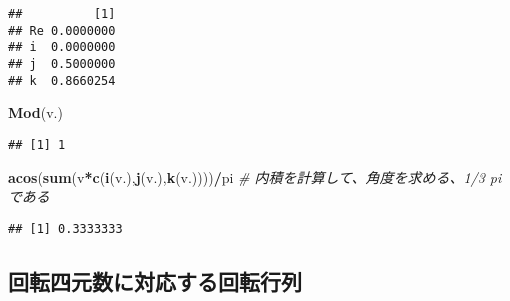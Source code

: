 \documentclass[]{article}
\newenvironment{Shaded}{\begin{snugshade}}{\end{snugshade}}
\newcommand{\KeywordTok}[1]{\textcolor[rgb]{0.13,0.29,0.53}{\textbf{#1}}}
\newcommand{\CommentTok}[1]{\textcolor[rgb]{0.56,0.35,0.01}{\textit{#1}}}
\newcommand{\OperatorTok}[1]{\textcolor[rgb]{0.81,0.36,0.00}{\textbf{#1}}}
\newcommand{\NormalTok}[1]{#1}
\begin{document}
\begin{verbatim}
##          [1]
## Re 0.0000000
## i  0.0000000
## j  0.5000000
## k  0.8660254
\end{verbatim}

\begin{Shaded}
\begin{Highlighting}[]
\KeywordTok{Mod}\NormalTok{(v.)}
\end{Highlighting}
\end{Shaded}

\begin{verbatim}
## [1] 1
\end{verbatim}

\begin{Shaded}
\begin{Highlighting}[]
\KeywordTok{acos}\NormalTok{(}\KeywordTok{sum}\NormalTok{(v}\OperatorTok{*}\KeywordTok{c}\NormalTok{(}\KeywordTok{i}\NormalTok{(v.),}\KeywordTok{j}\NormalTok{(v.),}\KeywordTok{k}\NormalTok{(v.))))}\OperatorTok{/}\NormalTok{pi }\CommentTok{# 内積を計算して、角度を求める、1/3 pi である}
\end{Highlighting}
\end{Shaded}

\begin{verbatim}
## [1] 0.3333333
\end{verbatim}

\subsection{回転四元数に対応する回転行列}\label{ux56deux8ee2ux56dbux5143ux6570ux306bux5bfeux5fdcux3059ux308bux56deux8ee2ux884cux5217}
\end{document}
